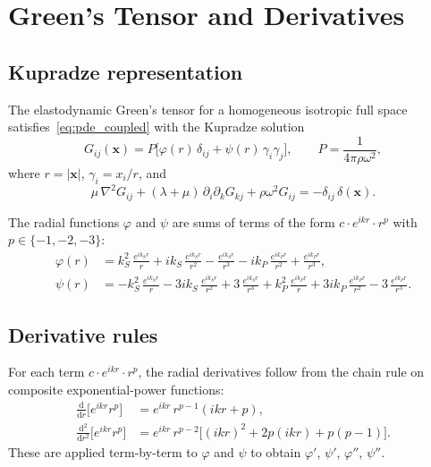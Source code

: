 \documentclass[11pt,a4paper]{article}
\newcommand{\bx}{\mathbf{x}}
\newcommand{\dd}{\mathrm{d}}
\begin{document}
\section{Green's Tensor and Derivatives}
\label{sec:greens}

\subsection{Kupradze representation}

The elastodynamic Green's tensor for a homogeneous isotropic full
space satisfies~\eqref{eq:pde_coupled} with the Kupradze solution
\begin{equation}
  G_{ij}(\bx)
  = P\bigl[\varphi(r)\,\delta_{ij}
    + \psi(r)\,\gamma_i\gamma_j\bigr],
  \qquad
  P = \frac{1}{4\pi\rho\omega^2},
  \label{eq:Kupradze}
\end{equation}
where $r = |\bx|$, $\gamma_i = x_i / r$, and
\begin{equation}
  \mu\,\nabla^2 G_{ij}
  + (\lambda + \mu)\,\partial_i\partial_k G_{kj}
  + \rho\omega^2 G_{ij}
  = -\delta_{ij}\,\delta(\bx).
  \label{eq:pde_coupled}
\end{equation}

The radial functions $\varphi$ and $\psi$ are sums of terms of the
form $c \cdot e^{ikr} \cdot r^p$ with $p \in \{-1,-2,-3\}$:
\begin{align}
  \varphi(r) &= k_S^2\,\frac{e^{ik_S r}}{r}
    + ik_S\,\frac{e^{ik_S r}}{r^2}
    - \frac{e^{ik_S r}}{r^3}
    - ik_P\,\frac{e^{ik_P r}}{r^2}
    + \frac{e^{ik_P r}}{r^3}, \label{eq:phi} \\[6pt]
  \psi(r) &= -k_S^2\,\frac{e^{ik_S r}}{r}
    - 3ik_S\,\frac{e^{ik_S r}}{r^2}
    + 3\,\frac{e^{ik_S r}}{r^3}
    + k_P^2\,\frac{e^{ik_P r}}{r}
    + 3ik_P\,\frac{e^{ik_P r}}{r^2}
    - 3\,\frac{e^{ik_P r}}{r^3}. \label{eq:psi}
\end{align}

\subsection{Derivative rules}

For each term $c \cdot e^{ikr} \cdot r^p$, the radial derivatives
follow from the chain rule on composite exponential-power
functions:
\begin{align}
  \frac{\dd}{\dd r}\bigl[e^{ikr} r^p\bigr]
  &= e^{ikr}\,r^{p-1}(ikr + p), \label{eq:d1} \\[4pt]
  \frac{\dd^2}{\dd r^2}\bigl[e^{ikr} r^p\bigr]
  &= e^{ikr}\,r^{p-2}\bigl[(ikr)^2 + 2p(ikr)
    + p(p-1)\bigr]. \label{eq:d2}
\end{align}
These are applied term-by-term to $\varphi$ and $\psi$ to obtain
$\varphi'$, $\psi'$, $\varphi''$, $\psi''$.
\end{document}
